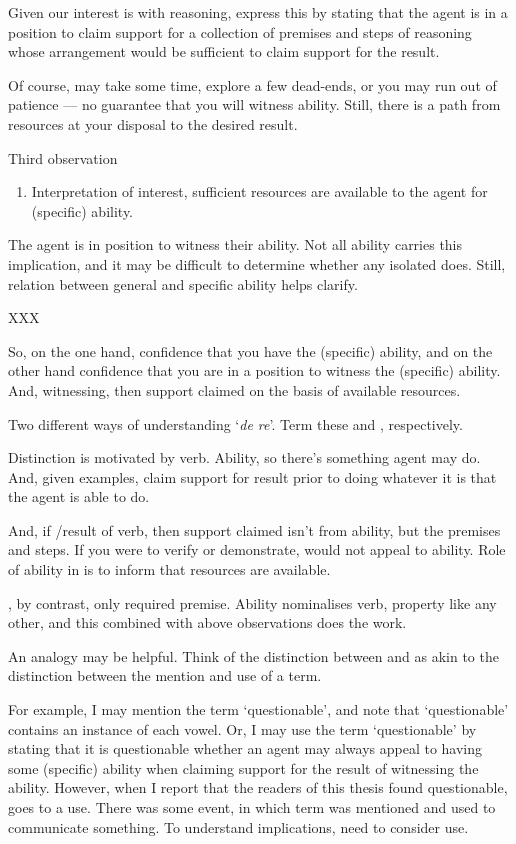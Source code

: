 \begin{note}
  Given our interest is with reasoning, express this by stating that the agent is in a position to claim support for a collection of premises and steps of reasoning whose arrangement would be sufficient to claim support for the result.

  Of course, may take some time, explore a few dead-ends, or you may run out of patience --- no guarantee that you will witness ability.
  Still, there is a path from resources at your disposal to the desired result.

  Third observation
  \begin{enumerate}[label=(O\arabic*), ref=(O\arabic*), resume*=i_ob]
  \item\label{intro:obs:resources} Interpretation of interest, sufficient resources are available to the agent for (specific) ability.
  \end{enumerate}
  The agent is in position to witness their ability.
  Not all ability carries this implication, and it may be difficult to determine whether any isolated does.
  Still, relation between general and specific ability helps clarify.

  XXX

  So, on the one hand, confidence that you have the (specific) ability, and on the other hand confidence that you are in a position to witness the (specific) ability.
  And, witnessing, then support claimed on the basis of available resources.

  Two different ways of understanding `\emph{de re}'.
  Term these \AR{} and \WR{}, respectively.

  Distinction is motivated by verb.
  Ability, so there's something agent may do.
  And, given examples, claim support for result prior to doing whatever it is that the agent is able to do.

  And, if \WR{}/result of verb, then support claimed isn't from ability, but the premises and steps.
  If you were to verify or demonstrate, would not appeal to ability.
  Role of ability in \WR{} is to inform that resources are available.

  \AR{}, by contrast, only required premise.
  Ability nominalises verb, property like any other, and this combined with above observations does the work.

  An analogy may be helpful.
  Think of the distinction between \AR{} and \WR{} as akin to the distinction between the mention and use of a term.

    For example, I may mention the term `questionable', and note that `questionable' contains an instance of each vowel.
  Or, I may use the term `questionable' by stating that it is questionable whether an agent may always appeal to having some (specific) ability when claiming support for the result of witnessing the ability.
  However, when I report that the readers of this thesis found questionable, goes to a use.
  There was some event, in which term was mentioned and used to communicate something.
  To understand implications, need to consider use.


\end{note}
